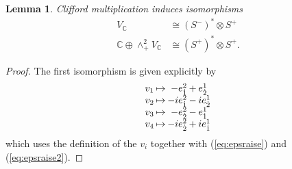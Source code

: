 \documentclass[twoside]{amsart}
\newcommand{\tighten}{\setlength{\arraycolsep}{1pt}}
\newcommand{\CC}{\ensuremath{\mathbb{C}}}
\newtheorem{lemma}{Lemma}
\renewcommand{\eqref}[1]{(\ref{eq:#1})}
\newcommand{\enm}[1]{\ensuremath{#1}}
\newcommand{\spl}{\enm{S^{+}}}
\newcommand{\sm}{\enm{S^{-}}}
\newcommand{\spd}{\enm{(\spl)^{*}}}
\newcommand{\smd}{\enm{(\sm)^{*}}}
\newcommand{\upperlowerabc}[3]{\enm{{#1}^{#2}_{#3}}}
\newcommand{\upperdotlowerabc}[3]{\upperlowerabc{#1}{#2}{\dot{#3}}}
\newcommand{\eudl}[2]{\upperdotlowerabc{e}{#1}{#2}}
\begin{document}
\begin{lemma}
    \label{lemma:stov}
    Clifford multiplication induces isomorphisms
    \begin{align*}
        V_{\CC} &\cong \smd\otimes\spl \\
        \CC\oplus\wedge^{2}_{+}V_{\CC} &\cong \spd\otimes\spl.
    \end{align*}
\end{lemma}

\begin{proof} The first isomorphism is given explicitly by
\begin{equation}
    \label{eq:vtohom}
    \tighten{
    \begin{array}{rcrcl}
        v_{1} & \mapsto & -\eudl{2}{1} & + & \eudl{1}{2} \\
        v_{2} & \mapsto & -i\eudl{2}{1} & - & i\eudl{1}{2} \\
        v_{3} & \mapsto & -\eudl{2}{2} & - & \eudl{1}{1} \\
        v_{4} & \mapsto & -i\eudl{2}{2} & + & i\eudl{1}{1} \\
    \end{array}}
\end{equation}
which uses the definition of the \( v_{i} \) together with
\eqref{epsraise} and \eqref{epsraise2}.


\end{proof}
\end{document}

